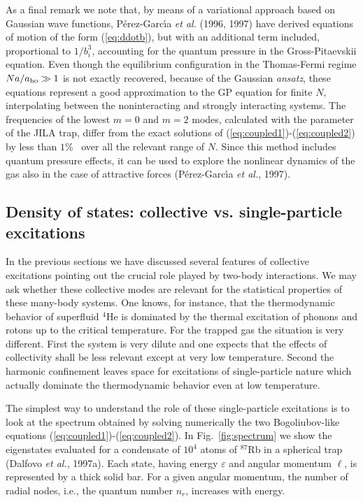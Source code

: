 As a final remark we note that, by means of a variational
approach based on Gaussian wave functions,
P\'erez-Garc\'\i a {\it et al.} (1996, 1997) have derived equations of
motion of the form (\ref{eq:ddotb}), but with an additional term included,
proportional to $1/b_i^3$, accounting for the quantum pressure
in the Gross-Pitaevskii equation.  Even though the equilibrium
configuration in the Thomas-Fermi regime $Na/a_{\rm ho} \gg1$ is
not exactly recovered, because of the Gaussian {\it ansatz}, these
equations represent a good approximation to the  GP equation for
finite $N$, interpolating  between the noninteracting and strongly
interacting  systems. The frequencies of the lowest $m=0$ and $m=2$
modes, calculated with the parameter of the JILA trap,
differ from the exact solutions of (\ref{eq:coupled1})-(\ref{eq:coupled2})
by less than $1$\% \ over all the relevant range of $N$.  Since this
method includes quantum pressure effects, it can be used to explore
the nonlinear dynamics of the gas also in the case of attractive forces 
(P\'erez-Garc\'\i a {\it et al.}, 1997). 


\subsection{ Density of states: collective vs. single-particle excitations}
\label{sec:collectivevssingleparticle}

In the previous sections we have discussed several features of collective
excitations pointing out the crucial role played by two-body interactions.
We may ask whether these collective modes are relevant for the statistical
properties of these many-body systems.  One knows, for instance, that the 
thermodynamic behavior of superfluid $^4$He is dominated by the thermal
excitation of  phonons  and rotons up to the critical temperature. For the
trapped gas the situation is very different. First the system is very
dilute and one expects that the effects of collectivity shall be less
relevant except at very low temperature. Second the harmonic confinement
leaves space for  excitations of single-particle nature which actually
dominate the thermodynamic behavior even at  low temperature.

The simplest way to understand the role of these single-particle
excitations is to look at the spectrum  obtained by solving numerically 
the two Bogoliubov-like equations  (\ref{eq:coupled1})-(\ref{eq:coupled2}). 
In Fig.~\ref{fig:spectrum} we show the eigenstates evaluated for a 
condensate of $10^4$ atoms of $^{87}$Rb in a spherical trap (Dalfovo 
{\it et al.}, 1997a). Each state, having energy $\varepsilon$ and angular 
momentum $\ell$, is represented by a thick solid bar. For a given 
angular momentum, the number of radial nodes, i.e., the quantum number
$n_r$, increases with energy. 

